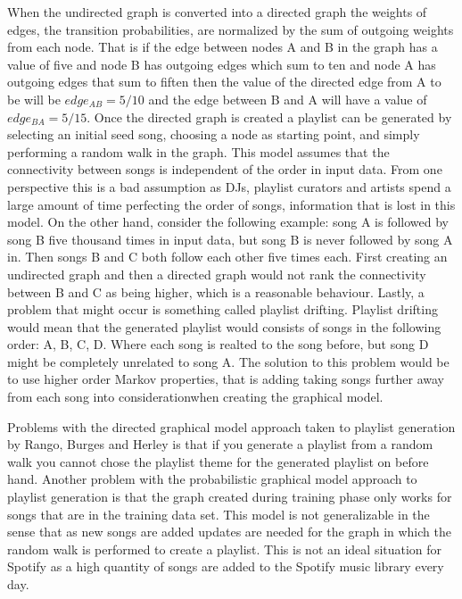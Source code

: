 \documentclass[a4paper,11pt]{kth-mag}
\begin{document}
  When the undirected graph is converted into a directed graph the weights of edges, the transition probabilities, are normalized by the sum of outgoing weights from each node. That is if the edge between nodes A and B in the graph has a value of five and node B has outgoing edges which sum to ten and node A has outgoing edges that sum to fiften then the value of the directed edge from A to be will be $edge_{AB} = 5 / 10$ and the edge between B and A will have a value of $edge_{BA} = 5 / 15$. Once the directed graph is created a playlist can be generated by selecting an initial seed song, choosing a node as starting point, and simply performing a random walk in the graph. This model assumes that the connectivity between songs is independent of the order in input data. From one perspective this is a bad assumption as DJs, playlist curators and artists spend a large amount of time perfecting the order of songs, information that is lost in this model. On the other hand, consider the following example: song A is followed by song B five thousand times in input data, but song B is never followed by song A in. Then songs B and C both follow each other five times each. First creating an undirected graph and then a directed graph would not rank the connectivity between B and C as being higher, which is a reasonable behaviour. Lastly, a problem that might occur is something called playlist drifting. Playlist drifting would mean that the generated playlist would consists of songs in the following order: A, B, C, D. Where each song is realted to the song before, but song D might be completely unrelated to song A. The solution to this problem would be to use higher order Markov properties, that is adding taking songs further away from each song into considerationwhen creating the graphical model\cite{ragno2005inferring}. 

Problems with the directed graphical model approach taken to playlist generation by Rango, Burges and Herley is that if you generate a playlist from a random walk you cannot chose the playlist theme for the generated playlist on before hand. Another problem with the probabilistic graphical model approach to playlist generation is that the graph created during training phase only works for songs that are in the training data set. This model is not generalizable in the sense that as new songs are added updates are needed for the graph in which the random walk is performed to create a playlist. This is not an ideal situation for Spotify as a high quantity of songs are added to the Spotify music library every day\cite{spotifyPress}.
\end{document}
